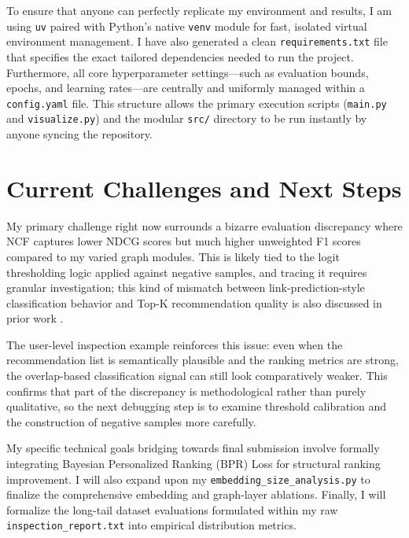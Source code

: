 \documentclass[12pt, a4paper]{article}
\begin{document}
To ensure that anyone can perfectly replicate my environment and results, I am using \texttt{uv} paired with Python's native \texttt{venv} module for fast, isolated virtual environment management. I have also generated a clean \texttt{requirements.txt} file that specifies the exact tailored dependencies needed to run the project. Furthermore, all core hyperparameter settings—such as evaluation bounds, epochs, and learning rates—are centrally and uniformly managed within a \texttt{config.yaml} file. This structure allows the primary execution scripts (\texttt{main.py} and \texttt{visualize.py}) and the modular \texttt{src/} directory to be run instantly by anyone syncing the repository.


\section{Current Challenges and Next Steps}
My primary challenge right now surrounds a bizarre evaluation discrepancy where NCF captures lower NDCG scores but much higher unweighted F1 scores compared to my varied graph modules. This is likely tied to the logit thresholding logic applied against negative samples, and tracing it requires granular investigation; this kind of mismatch between link-prediction-style classification behavior and Top-K recommendation quality is also discussed in prior work \cite{yuan2024dotproduct}. 

The user-level inspection example reinforces this issue: even when the recommendation list is semantically plausible and the ranking metrics are strong, the overlap-based classification signal can still look comparatively weaker. This confirms that part of the discrepancy is methodological rather than purely qualitative, so the next debugging step is to examine threshold calibration and the construction of negative samples more carefully.

My specific technical goals bridging towards final submission involve formally integrating Bayesian Personalized Ranking (BPR) Loss for structural ranking improvement. I will also expand upon my \texttt{embedding\_size\_analysis.py} to finalize the comprehensive embedding and graph-layer ablations. Finally, I will formalize the long-tail dataset evaluations formulated within my raw \texttt{inspection\_report.txt} into empirical distribution metrics.
\end{document}
